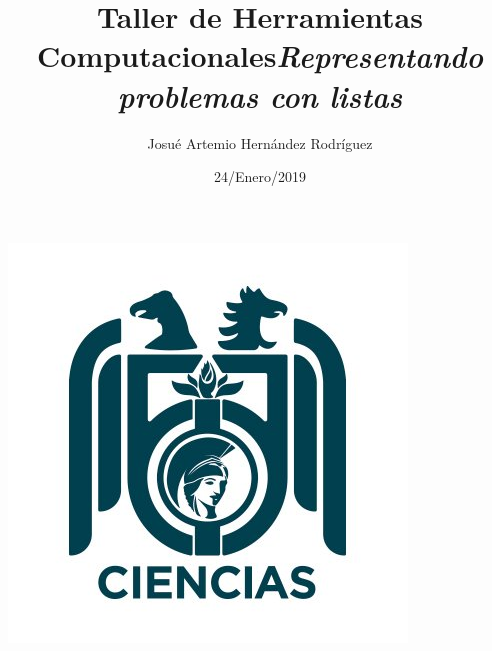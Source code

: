 \documentclass[letterpaper, 12pt,oneside]{article}
\title{\Huge Taller de Herramientas Computacionales}
\author{Josué Artemio Hernández Rodríguez}
\date{24/Enero/2019}
\begin{document}
	\maketitle
	\begin{center}
		\includegraphics[scale=0.7]{3.jpg}
	\end{center}

	\newpage
	
	\title{\huge \textit{Representando problemas con listas }}\\
	
\end{document}
